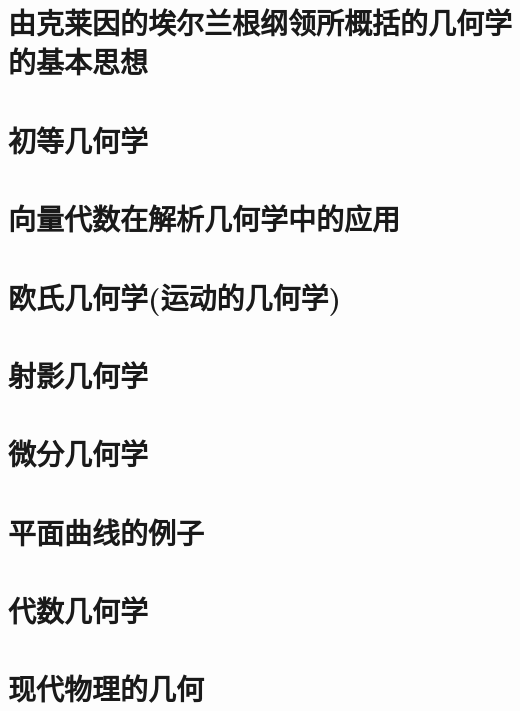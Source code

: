 \chapter{由克莱因的埃尔兰根纲领所概括的几何学的基本思想}
\chapter{初等几何学}
\chapter{向量代数在解析几何学中的应用}
\chapter{欧氏几何学(运动的几何学)}
\chapter{射影几何学}
\chapter{微分几何学}
\chapter{平面曲线的例子}
\chapter{代数几何学}
\chapter{现代物理的几何}
